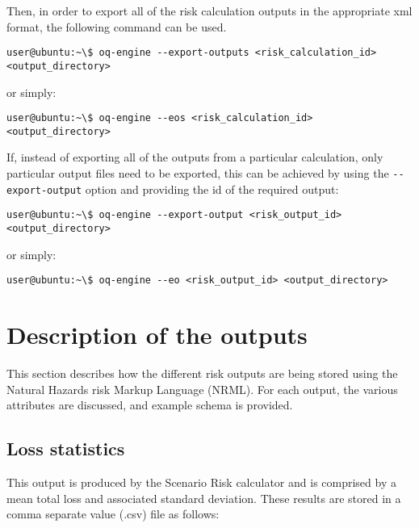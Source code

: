 Then, in order to export all of the risk calculation outputs in the appropriate xml
format, the following command can be used.

\begin{Verbatim}[frame=single, commandchars=\\\{\}, samepage=true]
user@ubuntu:~\$ oq-engine --export-outputs <risk_calculation_id> <output_directory>
\end{Verbatim}

or simply:

\begin{Verbatim}[frame=single, commandchars=\\\{\}, samepage=true]
user@ubuntu:~\$ oq-engine --eos <risk_calculation_id> <output_directory>
\end{Verbatim}

If, instead of exporting all of the outputs from a particular calculation,
only particular output files need to be exported, this can be achieved by
using the \Verb+--export-output+ option and providing the id of the required
output:

\begin{Verbatim}[frame=single, commandchars=\\\{\}, samepage=true]
user@ubuntu:~\$ oq-engine --export-output <risk_output_id> <output_directory>
\end{Verbatim}

or simply:

\begin{Verbatim}[frame=single, commandchars=\\\{\}, samepage=true]
user@ubuntu:~\$ oq-engine --eo <risk_output_id> <output_directory>
\end{Verbatim}


\section{Description of the outputs}

This section describes how the different risk outputs are being stored using
the Natural Hazards risk Markup Language (NRML). For each output, the various
attributes are discussed, and example schema is provided.

\subsection{Loss statistics}

This output is produced by the Scenario Risk calculator and is comprised by a
mean total loss and associated standard deviation. These results are stored in
a comma separate value (.csv) file as follows:

